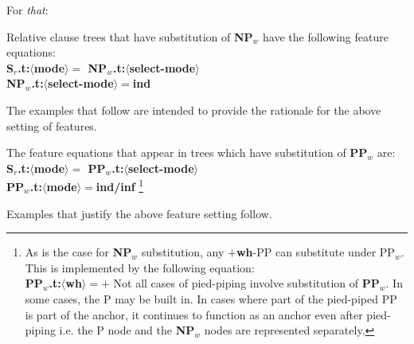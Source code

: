  
For {\em that}: 
\beginsentences
{}\label{ex:486} 
\label{ex:487} 
\label{ex:488} 
\label{ex:489} 
\endsentences

 
Relative clause trees that have substitution of {\bf NP$_{w}$} have 
the following feature equations:\\ 
{\bf S$_{r}$.t:$\langle$mode$\rangle =$ NP$_{w}$.t:$\langle$select-mode$\rangle$}\\ 
{\bf NP$_{w}$.t:$\langle$select-mode$\rangle =$ind} 
 
The examples that follow are intended to provide the rationale for 
the above setting of features. 
\beginsentences
{}\label{ex:490} 
\label{ex:491} 
\label{ex:492} 
\label{ex:493} 
\label{ex:494} 
\endsentences

 
The feature equations that appear in trees which have substitution of 
{\bf PP$_{w}$} are:\\ 
{\bf S$_{r}$.t:$\langle$mode$\rangle =$ PP$_{w}$.t:$\langle$select-mode$\rangle$}\\ 
{\bf PP$_{w}$.t:$\langle$mode$\rangle =$ind/inf} \footnote{As is the case for {\bf NP$_{w}$} substitution, any  $+${\bf wh}-PP can substitute under PP$_{w}$. This is implemented by the following equation:\\ {\bf PP$_{w}$.t:$\langle$wh$\rangle = +$}  Not all cases of pied-piping involve substitution of {\bf PP$_{w}$}. In some cases, the P may be built in. In cases where part of the pied-piped PP is part of the anchor, it continues to function as an anchor even after pied-piping i.e. the P node and the {\bf NP$_{w}$} nodes are represented separately. } 
 
Examples that justify the above feature setting follow. 
\beginsentences
{}\label{ex:495} 
\label{ex:496} 
\label{ex:497} 
\label{ex:498} 
\endsentences

